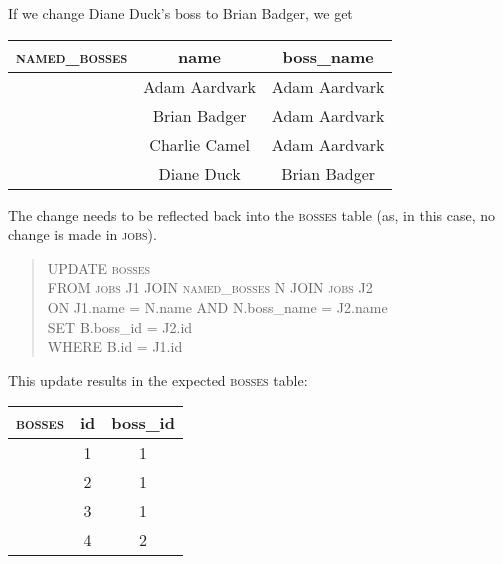 \documentclass{article}
\begin{document}
If we change Diane Duck's boss to Brian Badger, we get
\begin{center} \begin{tabular} {c | c c }
    \textsc{named\_bosses} & name & boss\_name \\
    \hline
    & Adam Aardvark & Adam Aardvark \\
    & Brian Badger & Adam Aardvark \\
    & Charlie Camel & Adam Aardvark \\
    & Diane Duck & Brian Badger
\end{tabular} \end{center}
The change needs to be reflected back into the \textsc{bosses}
table (as, in this case, no change is made in \textsc{jobs}).
\begin{quote}
    UPDATE \textsc{bosses} \\
    FROM \textsc{jobs} J1 JOIN \textsc{named\_bosses} N JOIN \textsc{jobs} J2 \\
    ON J1.name = N.name AND N.boss\_name = J2.name \\
    SET B.boss\_id = J2.id \\
    WHERE B.id = J1.id
\end{quote}
This update results in the expected \textsc{bosses} table:
\begin{center} \begin{tabular} {c | c c }
    \textsc{bosses} & id & boss\_id \\
    \hline
    & 1 & 1 \\
    & 2 & 1 \\
    & 3 & 1 \\
    & 4 & 2 
\end{tabular} \end{center}
\end{document}
